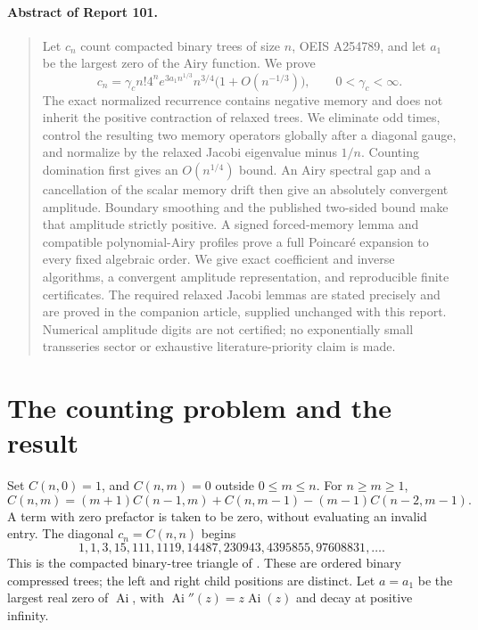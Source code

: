 \documentclass[11pt,letterpaper]{article}
\numberwithin{equation}{section}
\theoremstyle{remark}
\newcommand{\Ai}{\operatorname{Ai}}
\begin{document}
\paragraph{Abstract of Report 101.}
\begin{quote}\small
Let $c_n$ count compacted binary trees of size $n$, OEIS A254789, and let $a_1$ be the largest zero of the Airy function. We prove
\[
 c_n=\gamma_c n!4^n e^{3a_1n^{1/3}}n^{3/4}\bigl(1+O(n^{-1/3})\bigr),\qquad 0<\gamma_c<\infty.
\]
The exact normalized recurrence contains negative memory and does not inherit the positive contraction of relaxed trees. We eliminate odd times, control the resulting two memory operators globally after a diagonal gauge, and normalize by the relaxed Jacobi eigenvalue minus $1/n$. Counting domination first gives an $O(n^{1/4})$ bound. An Airy spectral gap and a cancellation of the scalar memory drift then give an absolutely convergent amplitude. Boundary smoothing and the published two-sided bound make that amplitude strictly positive. A signed forced-memory lemma and compatible polynomial-Airy profiles prove a full Poincar\'e expansion to every fixed algebraic order. We give exact coefficient and inverse algorithms, a convergent amplitude representation, and reproducible finite certificates. The required relaxed Jacobi lemmas are stated precisely and are proved in the companion article, supplied unchanged with this report. Numerical amplitude digits are not certified; no exponentially small transseries sector or exhaustive literature-priority claim is made.
\end{quote}

\section{The counting problem and the result}\label{air:jp:cb:sec:result}
Set $C(n,0)=1$, and $C(n,m)=0$ outside $0\le m\le n$. For $n\ge m\ge1$,
\begin{equation}\label{air:jp:cb:eq:C}
 C(n,m)=(m+1)C(n-1,m)+C(n,m-1)-(m-1)C(n-2,m-1).
\end{equation}
A term with zero prefactor is taken to be zero, without evaluating an invalid entry. The diagonal $c_n=C(n,n)$ begins
\[
 1,1,3,15,111,1119,14487,230943,4395855,97608831,\ldots.
\]
This is the compacted binary-tree triangle of \cite[Proposition 2.11]{epfw}. These are ordered binary compressed trees; the left and right child positions are distinct. Let $a=a_1$ be the largest real zero of $\Ai$, with $\Ai''(z)=z\Ai(z)$ and decay at positive infinity.
\end{document}
